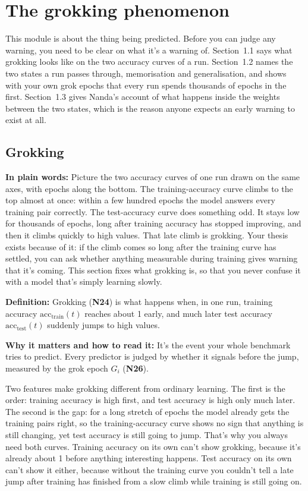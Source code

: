 \documentclass[11pt,a4paper,oneside,openany]{report}
\newcommand{\acctest}{\mathrm{acc}_{\mathrm{test}}}
\newcommand{\acctrain}{\mathrm{acc}_{\mathrm{train}}}
\newcommand{\gl}[1]{\textbf{#1}}   %
\newcommand{\fplain}{\textbf{In plain words:} }
\newcommand{\fdef}{\textbf{Definition:} }
\newcommand{\fread}{\par\textbf{Why it matters and how to read it:} }
\begin{document}
\chapter{The grokking phenomenon}

This module is about the thing being predicted. Before you can judge any warning, you need to be clear on what it's a warning of. Section~1.1 says what grokking looks like on the two accuracy curves of a run. Section~1.2 names the two states a run passes through, memorisation and generalisation, and shows with your own grok epochs that every run spends thousands of epochs in the first. Section~1.3 gives Nanda's account of what happens inside the weights between the two states, which is the reason anyone expects an early warning to exist at all.

\section{Grokking}
\fplain Picture the two accuracy curves of one run drawn on the same axes, with epochs along the bottom. The training-accuracy curve climbs to the top almost at once: within a few hundred epochs the model answers every training pair correctly. The test-accuracy curve does something odd. It stays low for thousands of epochs, long after training accuracy has stopped improving, and then it climbs quickly to high values. That late climb is grokking. Your thesis exists because of it: if the climb comes so long after the training curve has settled, you can ask whether anything measurable during training gives warning that it's coming. This section fixes what grokking is, so that you never confuse it with a model that's simply learning slowly.

\fdef Grokking (\gl{N24}) is what happens when, in one run, training accuracy $\acctrain(t)$ reaches about 1 early, and much later test accuracy $\acctest(t)$ suddenly jumps to high values.
\fread It's the event your whole benchmark tries to predict. Every predictor is judged by whether it signals before the jump, measured by the grok epoch $G_i$ (\gl{N26}).

Two features make grokking different from ordinary learning. The first is the order: training accuracy is high first, and test accuracy is high only much later. The second is the gap: for a long stretch of epochs the model already gets the training pairs right, so the training-accuracy curve shows no sign that anything is still changing, yet test accuracy is still going to jump. That's why you always need both curves. Training accuracy on its own can't show grokking, because it's already about 1 before anything interesting happens. Test accuracy on its own can't show it either, because without the training curve you couldn't tell a late jump after training has finished from a slow climb while training is still going on.
\end{document}
